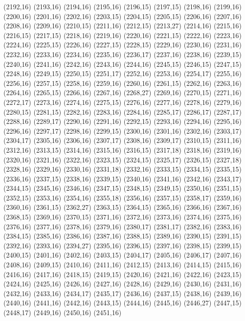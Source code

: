 (2192,16)
(2193,16)
(2194,16)
(2195,16)
(2196,15)
(2197,15)
(2198,16)
(2199,16)
(2200,16)
(2201,16)
(2202,16)
(2203,15)
(2204,15)
(2205,15)
(2206,16)
(2207,16)
(2208,16)
(2209,16)
(2210,15)
(2211,16)
(2212,15)
(2213,27)
(2214,16)
(2215,16)
(2216,15)
(2217,15)
(2218,16)
(2219,16)
(2220,16)
(2221,15)
(2222,16)
(2223,16)
(2224,16)
(2225,15)
(2226,16)
(2227,15)
(2228,15)
(2229,16)
(2230,16)
(2231,16)
(2232,16)
(2233,16)
(2234,16)
(2235,16)
(2236,17)
(2237,16)
(2238,16)
(2239,15)
(2240,16)
(2241,16)
(2242,16)
(2243,16)
(2244,16)
(2245,15)
(2246,15)
(2247,15)
(2248,16)
(2249,15)
(2250,15)
(2251,17)
(2252,16)
(2253,16)
(2254,17)
(2255,16)
(2256,16)
(2257,15)
(2258,16)
(2259,16)
(2260,16)
(2261,15)
(2262,16)
(2263,16)
(2264,16)
(2265,15)
(2266,16)
(2267,16)
(2268,27)
(2269,16)
(2270,15)
(2271,16)
(2272,17)
(2273,16)
(2274,16)
(2275,15)
(2276,16)
(2277,16)
(2278,16)
(2279,16)
(2280,15)
(2281,15)
(2282,16)
(2283,16)
(2284,16)
(2285,17)
(2286,17)
(2287,17)
(2288,16)
(2289,17)
(2290,16)
(2291,16)
(2292,15)
(2293,16)
(2294,16)
(2295,16)
(2296,16)
(2297,17)
(2298,16)
(2299,15)
(2300,16)
(2301,16)
(2302,16)
(2303,17)
(2304,17)
(2305,16)
(2306,16)
(2307,17)
(2308,16)
(2309,17)
(2310,15)
(2311,16)
(2312,16)
(2313,15)
(2314,16)
(2315,16)
(2316,15)
(2317,18)
(2318,16)
(2319,16)
(2320,16)
(2321,16)
(2322,16)
(2323,15)
(2324,15)
(2325,17)
(2326,15)
(2327,18)
(2328,16)
(2329,16)
(2330,16)
(2331,18)
(2332,16)
(2333,15)
(2334,15)
(2335,15)
(2336,16)
(2337,15)
(2338,16)
(2339,15)
(2340,16)
(2341,16)
(2342,16)
(2343,17)
(2344,15)
(2345,16)
(2346,16)
(2347,15)
(2348,15)
(2349,15)
(2350,16)
(2351,15)
(2352,15)
(2353,16)
(2354,16)
(2355,18)
(2356,16)
(2357,15)
(2358,17)
(2359,16)
(2360,16)
(2361,15)
(2362,27)
(2363,15)
(2364,15)
(2365,16)
(2366,16)
(2367,16)
(2368,15)
(2369,16)
(2370,15)
(2371,16)
(2372,16)
(2373,16)
(2374,16)
(2375,16)
(2376,16)
(2377,16)
(2378,16)
(2379,16)
(2380,17)
(2381,17)
(2382,16)
(2383,16)
(2384,15)
(2385,16)
(2386,16)
(2387,16)
(2388,15)
(2389,16)
(2390,15)
(2391,15)
(2392,16)
(2393,16)
(2394,27)
(2395,16)
(2396,15)
(2397,16)
(2398,15)
(2399,15)
(2400,15)
(2401,16)
(2402,16)
(2403,15)
(2404,17)
(2405,16)
(2406,17)
(2407,16)
(2408,16)
(2409,15)
(2410,16)
(2411,16)
(2412,15)
(2413,16)
(2414,15)
(2415,16)
(2416,16)
(2417,16)
(2418,15)
(2419,15)
(2420,16)
(2421,16)
(2422,16)
(2423,15)
(2424,16)
(2425,16)
(2426,16)
(2427,16)
(2428,16)
(2429,16)
(2430,16)
(2431,16)
(2432,16)
(2433,16)
(2434,17)
(2435,17)
(2436,16)
(2437,15)
(2438,16)
(2439,16)
(2440,16)
(2441,16)
(2442,16)
(2443,15)
(2444,16)
(2445,16)
(2446,27)
(2447,15)
(2448,17)
(2449,16)
(2450,16)
(2451,16)
